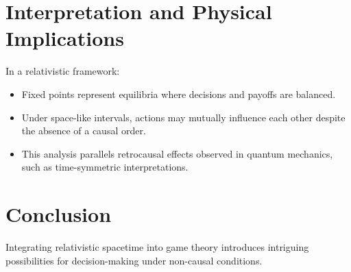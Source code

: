 \documentclass{article}
\begin{document}
\section{Interpretation and Physical Implications}
In a relativistic framework:
\begin{itemize}
    \item Fixed points represent equilibria where decisions and payoffs are balanced.
    \item Under space-like intervals, actions may mutually influence each other despite the absence of a causal order.
    \item This analysis parallels retrocausal effects observed in quantum mechanics, such as time-symmetric interpretations.
\end{itemize}

\section{Conclusion}
Integrating relativistic spacetime into game theory introduces intriguing possibilities for 
decision-making under non-causal conditions.
\end{document}
